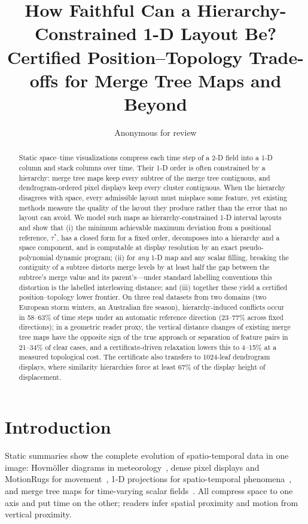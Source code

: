 \documentclass[10pt,twocolumn]{article}
\title{How Faithful Can a Hierarchy-Constrained 1-D Layout Be?\\Certified Position--Topology Trade-offs for Merge Tree Maps and Beyond}
\author{Anonymous for review}
\date{}
\begin{document}
\maketitle

\begin{abstract}
Static space--time visualizations compress each time step of a 2-D field into a 1-D column and stack columns over time. Their 1-D order is often constrained by a hierarchy: merge tree maps keep every subtree of the merge tree contiguous, and dendrogram-ordered pixel displays keep every cluster contiguous. When the hierarchy disagrees with space, every admissible layout must misplace some feature, yet existing methods measure the quality of the layout they produce rather than the error that no layout can avoid. We model such maps as hierarchy-constrained 1-D interval layouts and show that (i) the minimum achievable maximum deviation from a positional reference, $\tau^*$, has a closed form for a fixed order, decomposes into a hierarchy and a space component, and is computable at display resolution by an exact pseudo-polynomial dynamic program; (ii) for \emph{any} 1-D map and any scalar filling, breaking the contiguity of a subtree distorts merge levels by at least half the gap between the subtree's merge value and its parent's---under standard labelling conventions this distortion is the labelled interleaving distance; and (iii) together these yield a certified position--topology lower frontier. On three real datasets from two domains (two European storm winters, an Australian fire season), hierarchy-induced conflicts occur in 58--63\% of time steps under an automatic reference direction (23--77\% across fixed directions); in a geometric reader proxy, the vertical distance changes of existing merge tree maps have the opposite sign of the true approach or separation of feature pairs in 21--34\% of clear cases, and a certificate-driven relaxation lowers this to 4--15\% at a measured topological cost. The certificate also transfers to 1024-leaf dendrogram displays, where similarity hierarchies force at least 67\% of the display height of displacement.
\end{abstract}

\section{Introduction}
Static summaries show the complete evolution of spatio-temporal data in one image: Hovm\"oller diagrams in meteorology~\cite{hovmoller}, dense pixel displays and MotionRugs for movement~\cite{keim2000,motionrugs}, 1-D projections for spatio-temporal phenomena~\cite{franke2021}, and merge tree maps for time-varying scalar fields~\cite{tmtm,stmtm}. All compress space to one axis and put time on the other; readers infer spatial proximity and motion from vertical proximity.
\end{document}
